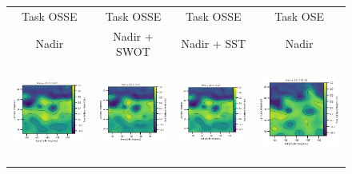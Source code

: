 \begin{figure}[ht!]
\small
\begin{center}
\setlength{\tabcolsep}{1pt}
\begin{tabular}{cccc}
\hspace{3mm} Task OSSE & 
\hspace{3mm} Task OSSE & 
\hspace{2mm} Task OSSE & 
Task OSE \\
\hspace{3mm}  Nadir & 
\hspace{3mm} Nadir + SWOT & 
\hspace{2mm} Nadir + SST & 
Nadir \\
\includegraphics[trim={0 13mm 22mm 0},clip, width=3.60cm,height=3.2cm]{00_Oceanbench/content/figures/fourdvarnet_figs/osse_gf_nadir_ssh.png} &
\includegraphics[trim={13mm 13mm 22mm 0},clip, width=3.2cm,height=3.2cm]{00_Oceanbench/content/figures/fourdvarnet_figs/osse_gf_nadirswot_ssh.png} &
\includegraphics[trim={13mm 13mm 22mm 0},clip, width=3.2cm,height=3.2cm]{00_Oceanbench/content/figures/fourdvarnet_figs/osse_gf_nadir_sst_ssh.png} &
\includegraphics[trim={13mm 13mm 0 0},clip,width=4.0cm,height=3.2cm]{00_Oceanbench/content/figures/fourdvarnet_figs/ose_gf_ssh.png} \\

\end{tabular}
\end{center}
\end{figure}
